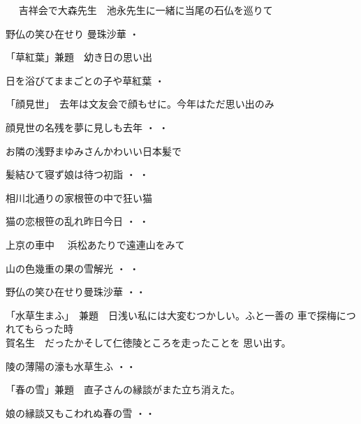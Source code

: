 \noindent　
吉祥会で大森先生　池永先生に一緒に当尾の石仏を巡りて　
\begin{shiika}
野仏の笑ひ在せり 曼珠沙華\hfill {  ・  }
\end{shiika}
\vspace{0.6cm}
「草紅葉」兼題　幼き日の思い出　
\begin{shiika}
 日を浴びてままごとの子や草紅葉\hfill {  ・  }
\end{shiika}
\vspace{0.6cm}
「顔見世」　去年は文友会で顔もせに。今年はただ思い出のみ
\begin{shiika}
顔見世の名残を夢に見しも去年\hfill {  ・  ・}
\end{shiika}
\vspace{0.5cm}
\vspace{0.6cm}
お隣の浅野まゆみさんかわいい日本髪で
\begin{shiika}
髪結ひて寝ず娘は待つ初詣\hfill {  ・  ・}
\end{shiika}
\vspace{0.6cm}
相川北通りの家根笹の中で狂い猫
\begin{shiika}
猫の恋根笹の乱れ昨日今日\hfill {  ・  ・}
\end{shiika}
\vspace{0.6cm}
上京の車中　
浜松あたりで遠連山をみて
\begin{shiika}
山の色幾重の果の雪解光\hfill {  ・  ・ }	
\end{shiika}
\vspace{0.6cm}
\begin{shiika}野仏の笑ひ在せり曼珠沙華
\hfill{・・}\end{shiika}
\vspace{0.6cm}
「水草生まふ」　兼題　日浅い私には大変むつかしい。ふと一善の
車で探梅につれてもらった時\\賀名生　だったかそして仁徳陵ところを走ったことを
思い出す。
\begin{shiika}陵の薄陽の濠も水草生ふ
\hfill{・・}\end{shiika}
\vspace{0.6cm}
「春の雪」兼題　直子さんの縁談がまた立ち消えた。
\begin{shiika}娘の縁談又もこわれぬ春の雪
\hfill{・・}\end{shiika}

